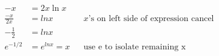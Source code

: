 \documentclass{article}
\begin{document}
\begin{description}
\begin{description}
\begin{align*}
                        -x            & = 2x\ln{x}                                                                                   \\
                        \frac{-x}{2x} & = ln{x}                                  &  & \text{$x$'s on left side of expression cancel} \\
                        -\frac{1}{2}  & = ln{x}                                                                                      \\
                        e^{-1/2}      & = e^{ln{x}} = x                          &  & \text{use e to isolate remaining x}            \\
                    \end{align*}


\end{description}
\end{description}
\end{document}
